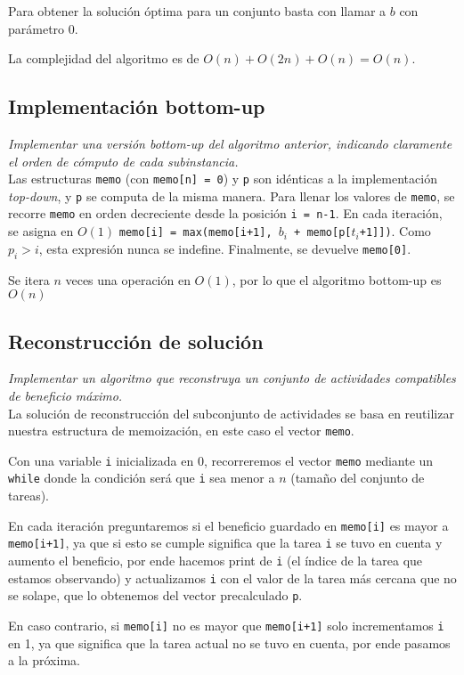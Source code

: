 \documentclass[10pt, a4paper]{article}
\begin{document}
Para obtener la solución óptima para un conjunto basta con llamar a $b$ con parámetro 0.

La complejidad del algoritmo es de $O(n) + O(2n) + O(n) = O(n)$.

\subsection{Implementación bottom-up}
\emph{Implementar una versión bottom-up del algoritmo anterior, indicando claramente el orden de cómputo de cada subinstancia.} \\

Las estructuras \texttt{memo} (con \texttt{memo[n] = 0}) y \texttt{p} son idénticas a la implementación \emph{top-down}, y \texttt{p} se computa de la misma manera. Para llenar los valores de \texttt{memo}, se recorre \texttt{memo} en orden decreciente desde la posición \texttt{i = n-1}. En cada iteración, se asigna en $O(1)$ \texttt{memo[i] = max(memo[i+1], $b_i$ + memo[p[$t_i$+1]])}. Como $p_i > i$, esta expresión nunca se indefine. Finalmente, se devuelve \texttt{memo[0]}.

Se itera $n$ veces una operación en $O(1)$, por lo que el algoritmo bottom-up es $O(n)$

\subsection{Reconstrucción de solución}
\emph{Implementar un algoritmo que reconstruya un conjunto de actividades compatibles de beneficio máximo.} \\

La solución de reconstrucción del subconjunto de actividades se basa en reutilizar nuestra estructura de memoización, en este caso el vector \texttt{memo}.

Con una variable \texttt{i} inicializada en 0, recorreremos el vector \texttt{memo} mediante un \texttt{while} donde la condición será que \texttt{i} sea menor a $n$ (tamaño del conjunto de tareas).

En cada iteración preguntaremos si el beneficio guardado en \texttt{memo[i]} es mayor a \texttt{memo[i+1]}, ya que si esto se cumple significa que la tarea \texttt{i} se tuvo en cuenta y aumento el beneficio, por ende hacemos print de \texttt{i} (el índice de la tarea que estamos observando) y actualizamos \texttt{i} con el valor de la tarea más cercana que no se solape, que lo obtenemos del vector precalculado \texttt{p}.

En caso contrario, si \texttt{memo[i]} no es mayor que \texttt{memo[i+1]} solo incrementamos \texttt{i} en 1, ya que significa que la tarea actual no se tuvo en cuenta, por ende pasamos a la próxima.
\end{document}
